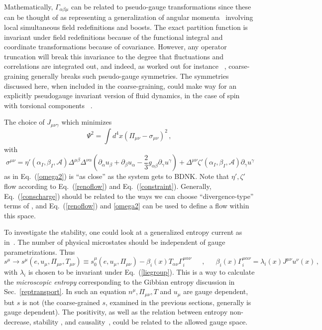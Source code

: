 \documentclass[12pt,onecolumn,showpacs,amssymb,aps,nofootinbib,floatfix]{revtex4-2}
\renewcommand{\eqref}[1]{Eq.~(\ref{#1})}
\newcommand{\eqcomma}{\phantom{AA},\phantom{AA}}
\begin{document}
	Mathematically, $\Gamma_{\alpha \beta \mu}$ can be related to pseudo-gauge transformations since these can be thought of as representing a generalization of angular momenta~\cite{brauner} involving local simultaneous field redefinitions and boosts. 
	\color{black}
	The exact partition function is invariant under field redefinitions \cite{peskin} because of the functional integral and coordinate transformations because of covariance.   However, any operator truncation will break this invariance to the degree that fluctuations and correlations are integrated out, and indeed, as worked out for instance ~\cite{fluctgauge}, coarse-graining generally breaks such pseudo-gauge symmetries.   The symmetries discussed here, when included in the coarse-graining, could make way for an explicitly pseudogauge invariant version of fluid dynamics, in the case of spin with torsional components ~\cite{grossi}\color{black}.
	
	The choice of $J_{\mu \nu \gamma}$ which minimizes
	\begin{equation}
		\label{omega2}
		\Psi^2= \int d^4 x \left( \Pi_{\mu \nu} - \sigma_{\mu \nu} \right)^2\,,
	\end{equation}
	with
	\[\ \sigma^{\mu \nu} =\eta'(\alpha_I,\beta_I,\mathcal{A})  \Delta^{\mu \beta} \Delta^{\nu \alpha} \left(\partial_\alpha u_\beta+\partial_\beta u_\alpha-\frac{2}{3} g_{\alpha \beta} \partial _\gamma u^\gamma \right) +\Delta^{\mu \nu} \zeta'(\alpha_I,\beta_I,\mathcal{A}) \partial_\gamma u^\gamma \]
	as in \eqref{omega2} is ``as close'' as the system gets to BDNK.  
	Note that $\eta',\zeta'$ flow according to \eqref{renoflow} and \eqref{constraint}.  
	Generally, \eqref{conscharge} should be related to the ways we can choose ``divergence-type'' terms of \cite{geroch}, and \eqref{renoflow} and \ref{omega2} can be used to define a flow within this space.
	
	To investigate the stability, one could look at a generalized entropy current as in~\cite{gavassino}. The number of physical microstates should be independent of gauge parametrizations. Thus 
	\begin{equation}
		\label{gaugeen}
		s^\mu \rightarrow s^\mu(e,u_\mu,\Pi_{\mu \nu},T_{\mu \nu}) \equiv  s_{0}^\mu (e,u_\mu,\Pi_{\mu \nu}) -\beta_i(x)T_{\alpha \nu} \Gamma^{\mu \alpha \nu}_i \eqcomma  \beta_i(x) \Gamma^{\mu \alpha \nu}_i = \lambda_i(x) J^{\mu \nu} u^\nu(x)\,,
	\end{equation}
	with $\lambda_i$ is chosen to be invariant under \eqref{liegroup}.
	This is a way to calculate the {\em microscopic entropy} corresponding to the Gibbian entropy discussion in Sec.~\ref{reptransport}. 
	In such an equation $n^\mu,\Pi_{\mu \nu},T$ and $u_\mu$ are gauge dependent, but $s$ is not (the coarse-grained $s$, examined in the previous sections, generally is gauge dependent).  The positivity, as well as the relation between entropy non-decrease, stability \cite{gavassino,gavagibbs}, and causality~\cite{GavaCausality2021}, could be related to the allowed gauge space.
	
\end{document}
